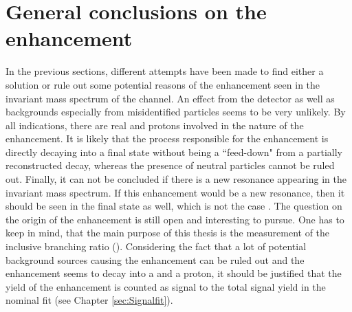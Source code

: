 \section{General conclusions on the enhancement}
In the previous sections, different attempts have been made to find either a solution or rule out some potential reasons of the enhancement seen in the invariant \Dz\proton mass spectrum of the \LbToDpmunuX channel.
An effect from the detector as well as backgrounds especially from misidentified particles seems to be very unlikely.
By all indications, there are real \Dz and protons involved in the nature of the enhancement.
It is likely that the process responsible for the enhancement is directly decaying into a \Dz\proton final state without being a ``feed-down" from a partially reconstructed decay, whereas the presence of neutral particles cannot be ruled out.
Finally, it can not be concluded if there is a new resonance appearing in the invariant \Dz\proton mass spectrum.
If this enhancement would be a new \Lc resonance, then it should be seen in the \Lc\pip\pim final state as well, which is not the case \cite{PDG}.
The question on the origin of the enhancement is still open and interesting to pursue.
One has to keep in mind, that the main purpose of this thesis is the measurement of the inclusive branching ratio \BR(\LbToDpmunuX). 
Considering the fact that a lot of potential background sources causing the enhancement can be ruled out and the enhancement seems to decay into a \Dz and a proton, it should be justified that the yield of the enhancement is counted as signal to
the total signal yield \NDp in the nominal fit (see Chapter \ref{sec:Signalfit}). 
